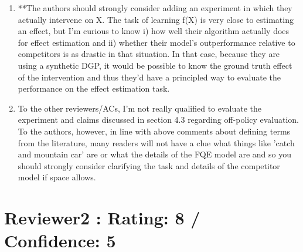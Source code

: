 \documentclass{article}
\begin{document}
\begin{enumerate}

\item **The authors should strongly consider adding an experiment in which they actually intervene on X. The task of learning f(X) is very close to estimating an effect, but I'm curious to know i) how well their algorithm actually does for effect estimation and ii) whether their model's outperformance relative to competitors is as drastic in that situation. In that case, because they are using a synthetic DGP, it would be possible to know the ground truth effect of the intervention and thus they'd have a principled way to evaluate the performance on the effect estimation task.


\item To the other reviewers/ACs, I'm not really qualified to evaluate the experiment and claims discussed in section 4.3 regarding off-policy evaluation. To the authors, however, in line with above comments about defining terms from the literature, many readers will not have a clue what things like 'catch and mountain car' are or what the details of the FQE model are and so you should strongly consider clarifying the task and details of the competitor model if space allows.

\end{enumerate}

\section{Reviewer2 : Rating: 8 / Confidence: 5}
\end{document}
